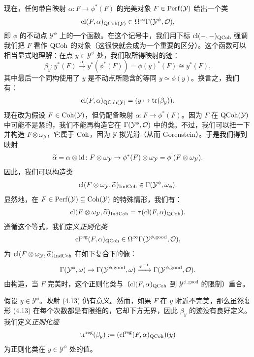 现在，任何带自映射 $\alpha\colon F\to\phi^*(F)$ 的完美对象 $F\in\mathrm{Perf}(\mathcal{Y})$ 给出一个类
\[
  \operatorname{cl}(F,\alpha)_{\mathrm{QCoh}(\mathcal{Y})}\in\Omega^\infty\Gamma(\mathcal{Y}^{\phi},\mathcal{O}),
\]
即 $\phi$ 的不动点 $\mathcal{Y}^{\phi}$ 上的一个函数。在这个记号中，我们用下标 $\operatorname{cl}(-,-)_{\mathrm{QCoh}}$ 强调我们把 $F$ 看作 $\mathrm{QCoh}$ 的对象（这很快就会成为一个重要的区分）。这个函数可以相当显式地理解：在点 $y\in\mathcal{Y}^{\phi}$ 处，我们取所得映射的迹：
\begin{equation}
  \beta_y\colon y^*(F)\xrightarrow{\alpha}y^*(\phi^*(F))=\phi(y)^*(F)\cong y^*(F),
\end{equation}
其中最后一个同构使用了 $y$ 是不动点所隐含的等同 $y\simeq\phi(y)$。换言之，我们有：
\[
  \operatorname{cl}(F,\alpha)_{\mathrm{QCoh}(\mathcal{Y})}=(y\mapsto\operatorname{tr}(\beta_y)).
\]
现在改为假设 $F\in\mathrm{Coh}(\mathcal{Y})$，但仍配备映射 $\alpha\colon F\to\phi^*(F)$。因为 $F$ 在 $\mathrm{QCoh}(\mathcal{Y})$ 中可能不是紧的，我们不能再构造它在 $\Gamma(\mathcal{Y}^{\phi},\mathcal{O})$ 中的类。不过，我们可以扭一下并构造 $F\otimes\omega_{\mathcal{Y}}$，它属于 $\mathrm{Coh}$，因为 $\mathcal{Y}$ 拟光滑（从而 Gorenstein）。于是我们得到映射
\[
  \widetilde\alpha=\alpha\otimes\operatorname{id}\colon
  F\otimes\omega_{\mathcal{Y}}\to\phi^*(F)\otimes\omega_{\mathcal{Y}}
  =\phi^!(F\otimes\omega_{\mathcal{Y}}).
\]
因此，我们可以构造类
\[
  \operatorname{cl}(F\otimes\omega_{\mathcal{Y}},\widetilde\alpha)_{\mathrm{IndCoh}}
  \in\Gamma(\mathcal{Y}^{\phi},\omega_{\phi}).
\]
显然地，在 $F\in\mathrm{Perf}(\mathcal{Y})\subseteq\mathrm{Coh}(\mathcal{Y})$ 的特殊情形，我们有：
\begin{equation}
  \operatorname{cl}(F\otimes\omega_{\mathcal{Y}},\widetilde\alpha)_{\mathrm{IndCoh}}
  =\tau(\operatorname{cl}(F,\alpha)_{\mathrm{QCoh}}).
\end{equation}
遵循这个等式，我们定义\emph{正则化类}
\[
  \operatorname{cl}^{\mathrm{reg}}(F,\alpha)_{\mathrm{QCoh}}\in\Omega^\infty\Gamma(\mathcal{Y}^{\phi,\mathrm{good}},\mathcal{O}),
\]
为 $\operatorname{cl}(F\otimes\omega_{\mathcal{Y}},\widetilde\alpha)_{\mathrm{IndCoh}}$ 在如下复合下的像：
\[
  \Gamma(\mathcal{Y}^{\phi},\omega)\to
  \Gamma(\mathcal{Y}^{\phi,\mathrm{good}},\omega)
  \xrightarrow{\tau^{-1}}\Gamma(\mathcal{Y}^{\phi,\mathrm{good}},\mathcal{O}).
\]
由构造，当 $F$ 完美时，这个正则化类与（$\operatorname{cl}(F,\alpha)_{\mathrm{QCoh}}$ 到 $\mathcal{Y}^{\phi,\mathrm{good}}$ 的限制）重合。

假设 $y\in\mathcal{Y}^{\phi}$。映射 (4.13) 仍有意义。然而，如果 $F$ 在 $y$ 附近不完美，那么虽然复形 (4.13) 在每个次数都是有限维的，它却下方无界，因此 $\beta_y$ 的迹没有良好定义。我们定义\emph{正则化迹}
\[
  \operatorname{tr}^{\mathrm{reg}}(\beta_y):=(\operatorname{cl}^{\mathrm{reg}}(F,\alpha)_{\mathrm{QCoh}})(y)
\]
为正则化类在 $y\in\mathcal{Y}^{\phi}$ 处的值。

